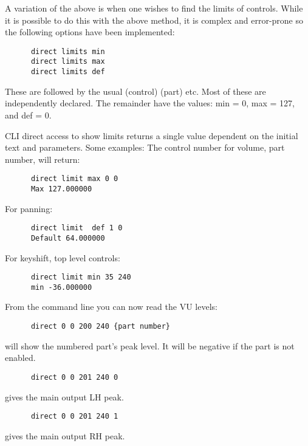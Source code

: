   A variation of the above is when one wishes to find the limits of controls.
   While it is possible to do this with the above method, it is complex and
   error-prone so the following options have been implemented:

   \begin{verbatim}
      direct limits min
      direct limits max
      direct limits def
   \end{verbatim}

   These are followed by the usual (control) (part) etc.  Most of these are independently declared. The remainder have the values: min = 0, max = 127, and def = 0.

   CLI direct access to show limits returns a single value dependent on the
   initial text and parameters.  Some examples:
   The control number for volume, part number, will return:

   \begin{verbatim}
      direct limit max 0 0
      Max 127.000000
   \end{verbatim}

For panning:

   \begin{verbatim}
      direct limit  def 1 0
      Default 64.000000
   \end{verbatim}

For keyshift, top level controls:

   \begin{verbatim}
      direct limit min 35 240
      min -36.000000
   \end{verbatim}

From the command line you can now read the VU levels:

   \begin{verbatim}
      direct 0 0 200 240 {part number}
   \end{verbatim}

will show the numbered part's peak level.
It will be negative if the part is not enabled.

   \begin{verbatim}
      direct 0 0 201 240 0
   \end{verbatim}

gives the main output LH peak.

   \begin{verbatim}
      direct 0 0 201 240 1
   \end{verbatim}

gives the main output RH peak.

